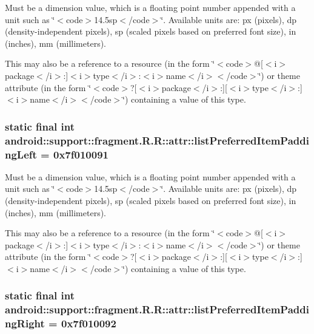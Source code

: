 Must be a dimension value, which is a floating point number appended with a unit such as \char`\"{}$<$code$>$14.5sp$<$/code$>$\char`\"{}. Available units are: px (pixels), dp (density-independent pixels), sp (scaled pixels based on preferred font size), in (inches), mm (millimeters). 

This may also be a reference to a resource (in the form \char`\"{}$<$code$>$@\mbox{[}$<$i$>$package$<$/i$>$:\mbox{]}$<$i$>$type$<$/i$>$:$<$i$>$name$<$/i$>$$<$/code$>$\char`\"{}) or theme attribute (in the form \char`\"{}$<$code$>$?\mbox{[}$<$i$>$package$<$/i$>$:\mbox{]}\mbox{[}$<$i$>$type$<$/i$>$:\mbox{]}$<$i$>$name$<$/i$>$$<$/code$>$\char`\"{}) containing a value of this type. \hypertarget{classandroid_1_1support_1_1fragment_1_1_r_1_1attr_0cb434338c9f8433cfa3e4b02872b5a9}{
\subsubsection[{listPreferredItemPaddingLeft}]{\setlength{\rightskip}{0pt plus 5cm}static final int android::support::fragment.R.R::attr::listPreferredItemPaddingLeft = 0x7f010091}}
\label{classandroid_1_1support_1_1fragment_1_1_r_1_1attr_0cb434338c9f8433cfa3e4b02872b5a9}


Must be a dimension value, which is a floating point number appended with a unit such as \char`\"{}$<$code$>$14.5sp$<$/code$>$\char`\"{}. Available units are: px (pixels), dp (density-independent pixels), sp (scaled pixels based on preferred font size), in (inches), mm (millimeters). 

This may also be a reference to a resource (in the form \char`\"{}$<$code$>$@\mbox{[}$<$i$>$package$<$/i$>$:\mbox{]}$<$i$>$type$<$/i$>$:$<$i$>$name$<$/i$>$$<$/code$>$\char`\"{}) or theme attribute (in the form \char`\"{}$<$code$>$?\mbox{[}$<$i$>$package$<$/i$>$:\mbox{]}\mbox{[}$<$i$>$type$<$/i$>$:\mbox{]}$<$i$>$name$<$/i$>$$<$/code$>$\char`\"{}) containing a value of this type. \hypertarget{classandroid_1_1support_1_1fragment_1_1_r_1_1attr_993f912647c8d220229de4bfa5367ebb}{
\subsubsection[{listPreferredItemPaddingRight}]{\setlength{\rightskip}{0pt plus 5cm}static final int android::support::fragment.R.R::attr::listPreferredItemPaddingRight = 0x7f010092}}
\label{classandroid_1_1support_1_1fragment_1_1_r_1_1attr_993f912647c8d220229de4bfa5367ebb}


